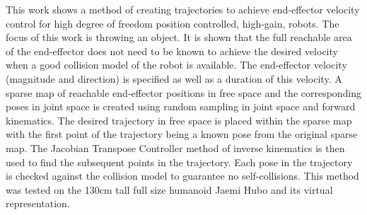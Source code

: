 This work shows a method of creating trajectories to achieve end-effector velocity control for high degree of freedom position controlled, high-gain, robots.  The focus of this work is throwing an object.  It is shown that the full reachable area of the end-effector does not need to be known to achieve the desired velocity when a good collision model of the robot is available.  The end-effector velocity (magnitude and direction) is specified as well as a duration of this velocity.  A sparse map of reachable end-effector positions in free space and the corresponding poses in joint space is created using random sampling in joint space and forward kinematics.  The desired trajectory in free space is placed within the sparse map with the first point of the trajectory being a known pose from the original sparse map.  The Jacobian Transpose Controller method of inverse kinematics is then used to find the subsequent points in the trajectory.  Each pose in the trajectory is checked against the collision model to guarantee no self-collisions.  This method was tested on the 130cm tall full size humanoid Jaemi Hubo and its virtual representation.